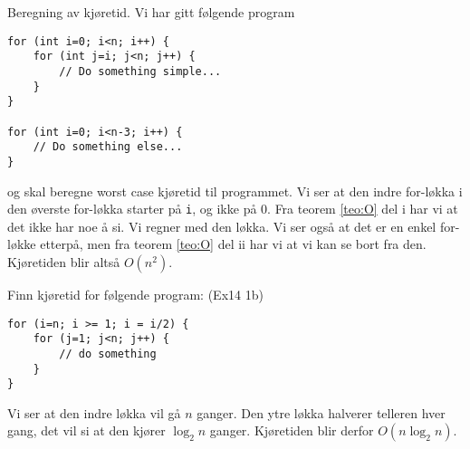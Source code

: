 \begin{eks} Beregning av kjøretid. Vi har gitt følgende program
\begin{verbatim}
for (int i=0; i<n; i++) {
    for (int j=i; j<n; j++) {
        // Do something simple...
    }
}

for (int i=0; i<n-3; i++) {
    // Do something else...
}
\end{verbatim}
og skal beregne worst case kjøretid til programmet. Vi ser at den indre for-løkka i den øverste for-løkka starter på \verb|i|, og ikke på 0. Fra teorem \ref{teo:O} del i har vi at det ikke har noe å si. Vi regner med den løkka. Vi ser også at det er en enkel for-løkke etterpå, men fra teorem \ref{teo:O} del ii har vi at vi kan se bort fra den. Kjøretiden blir altså $ O(n^2) $.
\end{eks}


\begin{eks} Finn kjøretid for følgende program: (Ex14 1b)

\begin{verbatim}
for (i=n; i >= 1; i = i/2) {
    for (j=1; j<n; j++) {
        // do something
    }
}
\end{verbatim}
Vi ser at den indre løkka vil gå $ n $ ganger. Den ytre løkka halverer telleren hver gang, det vil si at den kjører $ \log_2 n $ ganger. Kjøretiden blir derfor $ O(n\log_2 n) $.
\end{eks}

